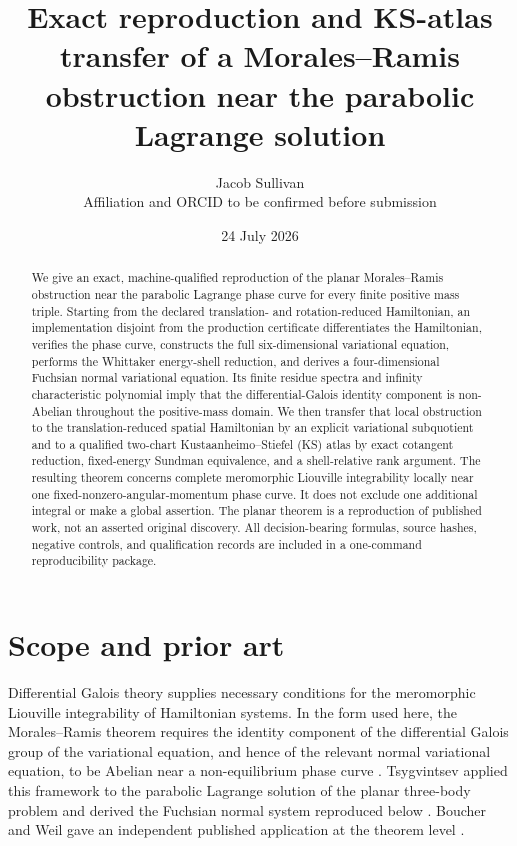 \documentclass[11pt]{article}
\title{\textbf{Exact reproduction and KS-atlas transfer of a
Morales--Ramis obstruction near the parabolic Lagrange solution}}
\author{Jacob Sullivan\\
\small Affiliation and ORCID to be confirmed before submission}
\date{24 July 2026}
\theoremstyle{definition}
\theoremstyle{remark}
\begin{document}
\maketitle

\begin{abstract}
We give an exact, machine-qualified reproduction of the planar
Morales--Ramis obstruction near the parabolic Lagrange phase curve for every
finite positive mass triple.  Starting from the declared
translation- and rotation-reduced Hamiltonian, an implementation disjoint
from the production certificate differentiates the Hamiltonian, verifies the
phase curve, constructs the full six-dimensional variational equation,
performs the Whittaker energy-shell reduction, and derives a four-dimensional
Fuchsian normal variational equation.  Its finite residue spectra and
infinity characteristic polynomial imply that the differential-Galois
identity component is non-Abelian throughout the positive-mass domain.  We
then transfer that local obstruction to the translation-reduced spatial
Hamiltonian by an explicit variational subquotient and to a qualified
two-chart Kustaanheimo--Stiefel (KS) atlas by exact cotangent reduction,
fixed-energy Sundman equivalence, and a shell-relative rank argument.
The resulting theorem concerns complete meromorphic Liouville integrability
locally near one fixed-nonzero-angular-momentum phase curve.  It does not
exclude one additional integral or make a global assertion.  The planar
theorem is a reproduction of published work, not an asserted original
discovery.  All decision-bearing formulas, source hashes, negative controls,
and qualification records are included in a one-command reproducibility
package.
\end{abstract}

\section{Scope and prior art}
\label{sec:scope}

Differential Galois theory supplies necessary conditions for the meromorphic
Liouville integrability of Hamiltonian systems.  In the form used here, the
Morales--Ramis theorem requires the identity component of the differential
Galois group of the variational equation, and hence of the relevant normal
variational equation, to be Abelian near a non-equilibrium phase curve
\cite{moralesramis2001}.  Tsygvintsev applied this framework to the
parabolic Lagrange solution of the planar three-body problem and derived the
Fuchsian normal system reproduced below \cite{tsygvintsev2002}.
Boucher and Weil gave an independent published application at the theorem
level \cite{boucherweil}.
\end{document}
